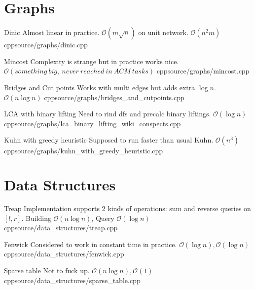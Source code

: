 \documentclass[landscape, 10pt, a4paper, oneside, twocolumn]{extarticle}
\begin{document}
\maketitlepage




\section{Graphs}

\Algorithm
{Dinic}
{Almost linear in practice. $\mathcal{O}(m \sqrt n)$ on unit network.}
{$\mathcal{O}(n^{2}m)$}
{cpp}{source/graphs/dinic.cpp}

\Algorithm
{Mincost}
{Complexity is strange but in practice works nice.}
{$\mathcal{O}(something\ big,\ never\ reached\ in\ ACM\ tasks)$}
{cpp}{source/graphs/mincost.cpp}

\Algorithm
{Bridges and Cut points}
{Works with multi edges but adds extra $ \log n$.}
{$\mathcal{O}(n \log n)$}
{cpp}{source/graphs/bridges_and_cutpoints.cpp}

\Algorithm
{LCA with binary lifting}
{Need to rind dfs and precalc binary liftings.}
{$\mathcal{O}(\log n)$}
{cpp}{source/graphs/lca_binary_lifting_wiki_conspects.cpp}

\Algorithm
{Kuhn with greedy heuristic}
{Supposed to run faster than usual Kuhn.}
{$\mathcal{O}(n^{3})$}
{cpp}{source/graphs/kuhn_with_greedy_heuristic.cpp}





\section{Data Structures}

\Algorithm
{Treap}
{Implementation supports 2 kinds of operations: sum and reverse queries on $[l, r]$.}
{Building $\mathcal{O}(n \log n)$, Query $\mathcal{O}(\log n)$}
{cpp}{source/data_structures/treap.cpp}

\Algorithm
{Fenwick}
{Considered to work in constant time in practice.}
{$\mathcal{O}(\log n), \mathcal{O}(\log n)$}
{cpp}{source/data_structures/fenwick.cpp}

\Algorithm
{Sparse table}
{Not to fuck up.}
{$\mathcal{O}(n \log n), \mathcal{O}(1)$}
{cpp}{source/data_structures/sparse_table.cpp}
\end{document}
